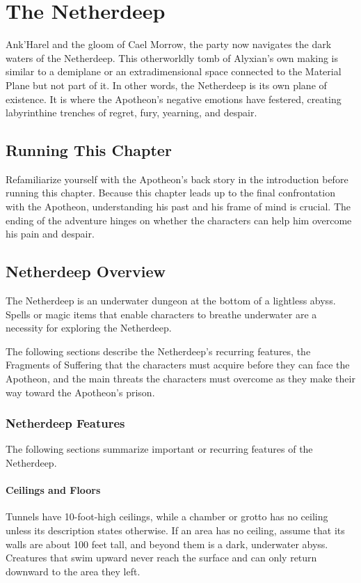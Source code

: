 \documentclass[10pt,a4paper,twoside,fancy,bg=print,twocolumn,openany,nodeprecatedcode]{dndbook}
\begin{document}
\mainmatter
\chapter*{The Netherdeep}
 Ank'Harel and the gloom of Cael Morrow, the party now navigates the dark waters of the Netherdeep. This otherworldly tomb of Alyxian's own making is similar to a demiplane or an extradimensional space connected to the Material Plane but not part of it. In other words, the Netherdeep is its own plane of existence. It is where the Apotheon's negative emotions have festered, creating labyrinthine trenches of regret, fury, yearning, and despair.


\section{Running This Chapter}
Refamiliarize yourself with the Apotheon's back story in the introduction before running this chapter. Because this chapter leads up to the final confrontation with the Apotheon, understanding his past and his frame of mind is crucial. The ending of the adventure hinges on whether the characters can help him overcome his pain and despair.

\section{Netherdeep Overview}
The Netherdeep is an underwater dungeon at the bottom of a lightless abyss. Spells or magic items that enable characters to breathe underwater are a necessity for exploring the Netherdeep.

The following sections describe the Netherdeep's recurring features, the Fragments of Suffering that the characters must acquire before they can face the Apotheon, and the main threats the characters must overcome as they make their way toward the Apotheon's prison.

\subsection{Netherdeep Features}
The following sections summarize important or recurring features of the Netherdeep.

\subsubsection{Ceilings and Floors}
Tunnels have 10-foot-high ceilings, while a chamber or grotto has no ceiling unless its description states otherwise. If an area has no ceiling, assume that its walls are about 100 feet tall, and beyond them is a dark, underwater abyss. Creatures that swim upward never reach the surface and can only return downward to the area they left.
\end{document}
